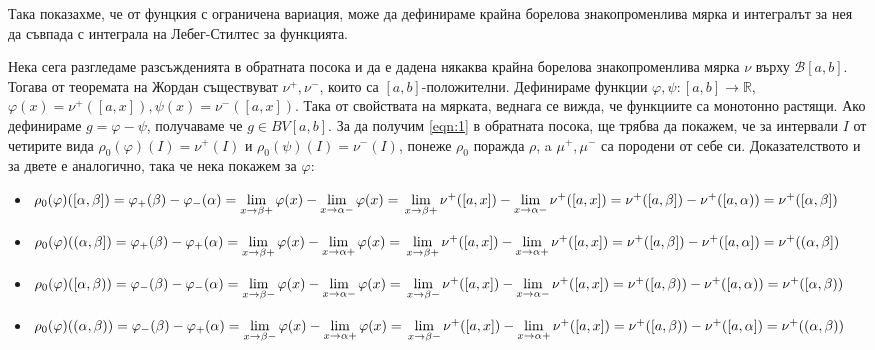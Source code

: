\documentclass[bulgarian, 12pt]{article}
\begin{document}
Така показахме, че от фунцкия с ограничена вариация, може да дефинираме крайна борелова знакопроменлива мярка и интегралът за нея да съвпада с интеграла на Лебег-Стилтес за функцията. \par
Нека сега разгледаме разсъжденията в обратната посока и да е дадена някаква крайна борелова знакопроменлива мярка $\nu$ върху $\mathcal{B}[a, b]$. Тогава от теоремата на Жордан съществуват $\nu^+, \nu^-$, които са $[a,b]$-положителни. Дефинираме функции $\varphi, \psi : [a, b] \to \mathbb{R}$, $\varphi(x) = \nu^+([a,x]), \psi(x) = \nu^-([a,x])$. Така от свойствата на мярката, веднага се вижда, че функциите са монотонно растящи. Ако дефинираме $g = \varphi - \psi$, получаваме че $g \in BV[a,b]$. За да получим \eqref{eqn:1} в обратната посока, ще трябва да покажем, че за интервали $I$ от четирите вида $\rho_0(\varphi)(I) = \nu^+(I)$ и $\rho_0(\psi)(I) = \nu^-(I)$, понеже $\rho_0$ поражда $\rho$, a $\mu^+, \mu^-$ са породени от себе си. Доказателството и за двете е аналогично, така че нека покажем за $\varphi$:
\begin{itemize}
  \item $\rho_0(\varphi)([\alpha, \beta]) =
  \varphi_+(\beta) - \varphi_-(\alpha) =
  \lim\limits_{x \to \beta+}\varphi(x) - \lim\limits_{x \to \alpha-}\varphi(x) = \\
  \lim\limits_{x \to \beta+}\nu^+([a,x]) - \lim\limits_{x \to \alpha-}\nu^+([a,x]) =
  \nu^+([a, \beta]) - \nu^+([a, \alpha)) =
  \nu^+([\alpha, \beta])$
  \item $\rho_0(\varphi)((\alpha, \beta]) =
  \varphi_+(\beta) - \varphi_+(\alpha) =
  \lim\limits_{x \to \beta+}\varphi(x) - \lim\limits_{x \to \alpha+}\varphi(x) = \\
  \lim\limits_{x \to \beta+}\nu^+([a,x]) - \lim\limits_{x \to \alpha+}\nu^+([a,x]) =
  \nu^+([a, \beta]) - \nu^+([a, \alpha]) =
  \nu^+((\alpha, \beta])$
  \item $\rho_0(\varphi)([\alpha, \beta)) =
  \varphi_-(\beta) - \varphi_-(\alpha) =
  \lim\limits_{x \to \beta-}\varphi(x) - \lim\limits_{x \to \alpha-}\varphi(x) = \\
  \lim\limits_{x \to \beta-}\nu^+([a,x]) - \lim\limits_{x \to \alpha-}\nu^+([a,x]) =
  \nu^+([a, \beta)) - \nu^+([a, \alpha)) =
  \nu^+([\alpha, \beta))$
  \item $\rho_0(\varphi)((\alpha, \beta)) =
  \varphi_-(\beta) - \varphi_+(\alpha) =
  \lim\limits_{x \to \beta-}\varphi(x) - \lim\limits_{x \to \alpha+}\varphi(x) = \\
  \lim\limits_{x \to \beta-}\nu^+([a,x]) - \lim\limits_{x \to \alpha+}\nu^+([a,x]) =
  \nu^+([a, \beta)) - \nu^+([a, \alpha]) =
  \nu^+((\alpha, \beta))$
\end{itemize}
\end{document}
